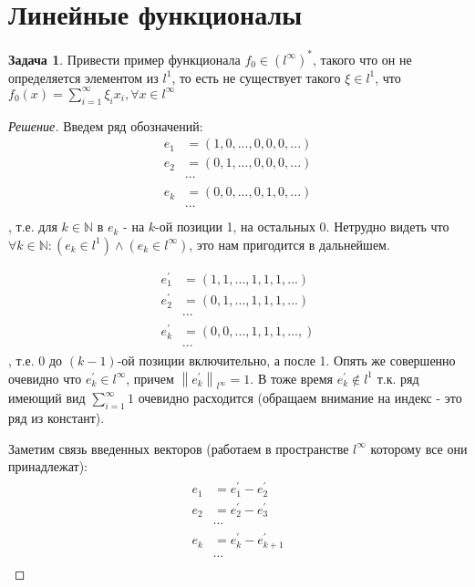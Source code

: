 \documentclass[12pt,a4paper]{article}
\theoremstyle{definition}
\newtheorem{exercise}{Задача}[section]
\newenvironment{solution}
{\renewcommand\qedsymbol{$\blacksquare$}\begin{proof}[Решение]}
{\end{proof}}
\newcommand{\Natural}{\mathbb{N}}
\newcommand{\norm}[1]{\left\lVert#1\right\rVert}
\newcommand{\conj}[1]{\left(#1\right)^*}
\begin{document}
	\section{Линейные функционалы}
	
	\begin{exercise}
		Привести пример функционала $f_0 \in \conj{l^\infty}$, такого что он не определяется элементом из $l^1$, то есть не существует такого $\xi \in l^1$, что \\ $f_0 (x) = \sum\limits_{i=1}^{\infty}{\xi_i x_i}, \forall x \in l^{\infty}$
	\end{exercise}
	\begin{solution} Введем ряд обозначений:
		\begin{align*}
			e_1 &= (1, 0, ..., 0, 0, 0, ...) 	\\
			e_2 &= (0, 1, ..., 0, 0, 0, ...) 	\\
				&\cdots						\\
			e_k &= (0, 0, ..., 0, 1, 0, ...)	\\
				&\cdots						\\
		\end{align*}
		, т.е. для $k \in \Natural$ в $e_k$ - на $k$-ой позиции 1, на остальных 0. Нетрудно видеть что $\forall k \in \Natural: (e_k \in l^1) \wedge (e_k \in l^\infty)$, это нам пригодится в дальнейшем.
		
		\begin{align*}
			e_1^\prime 	&= \left(1, 1, ..., 1, 1, 1, ...\right) \\
			e_2^\prime 	&= \left(0, 1, ..., 1, 1, 1, ...\right) 			\\
						&\cdots 				\\
			e_k^\prime 	&= \left(0, 0, ..., 1, 1, 1, ...,\right) \\
						&\cdots
		\end{align*}
		, т.е. 0 до $(k-1)$-ой позиции включительно, а после 1. Опять же совершенно очевидно что $e_k^\prime \in l^\infty$, причем $\norm{e_k^\prime}_{l^\infty} = 1$. В тоже время $e_k^\prime \notin l^1$ т.к. ряд имеющий вид $\sum\limits_{i=1}^\infty{1}$ очевидно расходится (обращаем внимание на индекс - это ряд из констант).
		
		Заметим связь введенных векторов (работаем в пространстве $l^\infty$ которому все они принадлежат):
		\begin{align}\label{eq:2}
		\begin{split}
			e_1 &= e_1^\prime - e_2^\prime \\
			e_2 &= e_2^\prime - e_3^\prime \\
					   &\cdots \\
			e_k &= e_{k}^\prime - e_{k+1}^\prime \\
					   &\cdots
		\end{split}
		\end{align}
		

\end{solution}
\end{document}
